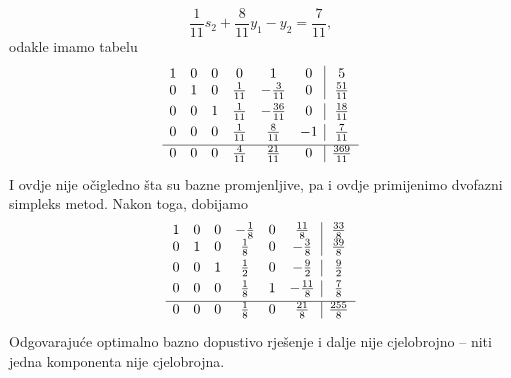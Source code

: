 \documentclass[a4paper, utf8, 11pt, colorlinks]{book}
\theoremstyle{definition}
\begin{document}
 $$ \frac{1}{11} s_2 + \frac{8}{11} y_1 - y_2 = \frac{7}{11},$$
 odakle imamo tabelu 
 $$\begin{array}{cccccc| c}
 1   &   0   &  0  &   0             &   1  &   0              &   5 \\\vspace{1mm}
 0   &   1   &  0  &  \frac{1}{11}    &   -\frac{3}{11}    &  0 & \frac{51}{11} \\\vspace{1mm}
 0   &   0   &  1  &  \frac{1}{11}    & -\frac{36}{11}       & 0 & \frac{18}{11}  \\\vspace{1mm}
 0   &   0   &  0  &  \frac{1}{11}    &  \frac{8}{11}   & -1 & \frac{7}{11} \\ \hline\vspace{1mm}
 0   &   0   &  0  &   \frac{4}{11}   &   \frac{21}{11} & 0 & \frac{369}{11}
\end{array} $$
I ovdje nije očigledno šta su bazne promjenljive, pa i ovdje primijenimo dvofazni simpleks metod. Nakon toga, dobijamo 
 $$\begin{array}{cccccc| c}
1    &   0   &   0   &  -\frac{1}{8}   &   0    &    \frac{11}{8}    &  \frac{33}{8} \\\vspace{1mm}
0    &   1   &   0   &   \frac{1}{8}   &   0    &    -\frac{3}{8}    & \frac{39}{8} \\\vspace{1mm}
0    &   0   &   1   &   \frac{1}{2}   &   0    &    - \frac{9}{2}   & \frac{9}{2} \\\vspace{1mm}
0    &   0   &   0   &   \frac{1}{8}   &   1    &    - \frac{11}{8}  & \frac{7}{8} \\ \hline\vspace{1mm}
0    &   0   &   0   &   \frac{1}{8}   &   0    &     \frac{21}{8}   & \frac{255}{8}
\end{array} $$
Odgovarajuće optimalno bazno dopustivo rješenje i dalje nije cjelobrojno -- niti jedna komponenta nije cjelobrojna. 
\end{document}
